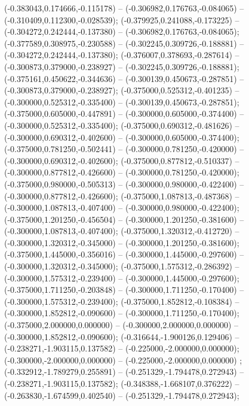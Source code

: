  (-0.383043,0.174666,-0.115178) -- (-0.306982,0.176763,-0.084065) -- (-0.310409,0.112300,-0.028539);
 (-0.379925,0.241088,-0.173225) -- (-0.304272,0.242444,-0.137380) -- (-0.306982,0.176763,-0.084065);
 (-0.377589,0.308975,-0.230588) -- (-0.302245,0.309726,-0.188881) -- (-0.304272,0.242444,-0.137380);
 (-0.376007,0.378693,-0.287614) -- (-0.300873,0.379000,-0.238927) -- (-0.302245,0.309726,-0.188881);
 (-0.375161,0.450622,-0.344636) -- (-0.300139,0.450673,-0.287851) -- (-0.300873,0.379000,-0.238927);
 (-0.375000,0.525312,-0.401235) -- (-0.300000,0.525312,-0.335400) -- (-0.300139,0.450673,-0.287851);
 (-0.375000,0.605000,-0.447891) -- (-0.300000,0.605000,-0.374400) -- (-0.300000,0.525312,-0.335400);
 (-0.375000,0.690312,-0.481626) -- (-0.300000,0.690312,-0.402600) -- (-0.300000,0.605000,-0.374400);
 (-0.375000,0.781250,-0.502441) -- (-0.300000,0.781250,-0.420000) -- (-0.300000,0.690312,-0.402600);
 (-0.375000,0.877812,-0.510337) -- (-0.300000,0.877812,-0.426600) -- (-0.300000,0.781250,-0.420000);
 (-0.375000,0.980000,-0.505313) -- (-0.300000,0.980000,-0.422400) -- (-0.300000,0.877812,-0.426600);
 (-0.375000,1.087813,-0.487368) -- (-0.300000,1.087813,-0.407400) -- (-0.300000,0.980000,-0.422400);
 (-0.375000,1.201250,-0.456504) -- (-0.300000,1.201250,-0.381600) -- (-0.300000,1.087813,-0.407400);
 (-0.375000,1.320312,-0.412720) -- (-0.300000,1.320312,-0.345000) -- (-0.300000,1.201250,-0.381600);
 (-0.375000,1.445000,-0.356016) -- (-0.300000,1.445000,-0.297600) -- (-0.300000,1.320312,-0.345000);
 (-0.375000,1.575312,-0.286392) -- (-0.300000,1.575312,-0.239400) -- (-0.300000,1.445000,-0.297600);
 (-0.375000,1.711250,-0.203848) -- (-0.300000,1.711250,-0.170400) -- (-0.300000,1.575312,-0.239400);
 (-0.375000,1.852812,-0.108384) -- (-0.300000,1.852812,-0.090600) -- (-0.300000,1.711250,-0.170400);
 (-0.375000,2.000000,0.000000) -- (-0.300000,2.000000,0.000000) -- (-0.300000,1.852812,-0.090600);
 (-0.316644,-1.900126,0.129406) -- (-0.238271,-1.903115,0.137582) -- (-0.225000,-2.000000,0.000000);
 (-0.300000,-2.000000,0.000000) -- (-0.225000,-2.000000,0.000000) ;
 (-0.332912,-1.789279,0.255891) -- (-0.251329,-1.794478,0.272943) -- (-0.238271,-1.903115,0.137582);
 (-0.348388,-1.668107,0.376222) -- (-0.263830,-1.674599,0.402540) -- (-0.251329,-1.794478,0.272943);
